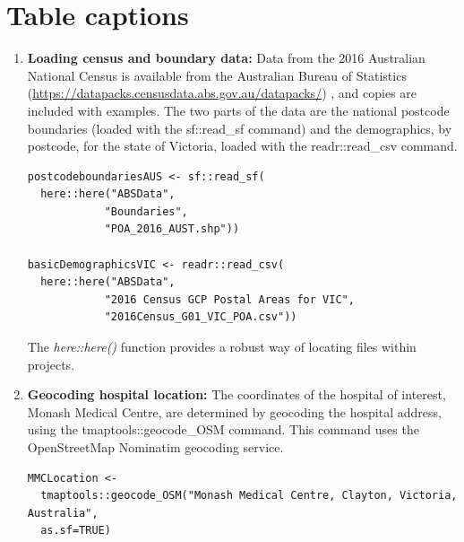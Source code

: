 \documentclass[utf8]{frontiersHLTH}
\begin{document}
\section*{Table captions}

\begin{table}[h]
\begin{center}
\begin{mdframed}[backgroundcolor=blue!20]
  \sffamily
  \tiny
\begin{enumerate}
\def\labelenumi{\arabic{enumi}.}
\item
  {\bf Loading census and boundary data:} Data from the 2016 Australian
  National Census is available from the Australian Bureau of Statistics
  (\url{https://datapacks.censusdata.abs.gov.au/datapacks/}) , and
  copies are included with examples. The two parts of the data are the
  national postcode boundaries (loaded with the sf::read\_sf command)
  and the demographics, by postcode, for the state of Victoria, loaded
  with the readr::read\_csv command.
\begin{lstlisting}
postcodeboundariesAUS <- sf::read_sf(
  here::here("ABSData", 
            "Boundaries", 
            "POA_2016_AUST.shp"))

basicDemographicsVIC <- readr::read_csv(
  here::here("ABSData", 
            "2016 Census GCP Postal Areas for VIC", 
            "2016Census_G01_VIC_POA.csv"))
\end{lstlisting}
The {\em here::here()} function provides a robust way of locating files within projects.
\item
  {\bf Geocoding hospital location:} The coordinates of the hospital of
  interest, Monash Medical Centre, are determined by geocoding the
  hospital address, using the tmaptools::geocode\_OSM command. This
  command uses the OpenStreetMap Nominatim geocoding service.
\begin{lstlisting}
MMCLocation <- 
  tmaptools::geocode_OSM("Monash Medical Centre, Clayton, Victoria, Australia", 
  as.sf=TRUE)


\end{lstlisting}
\end{enumerate}
\end{mdframed}
\end{center}
\end{table}
\end{document}
